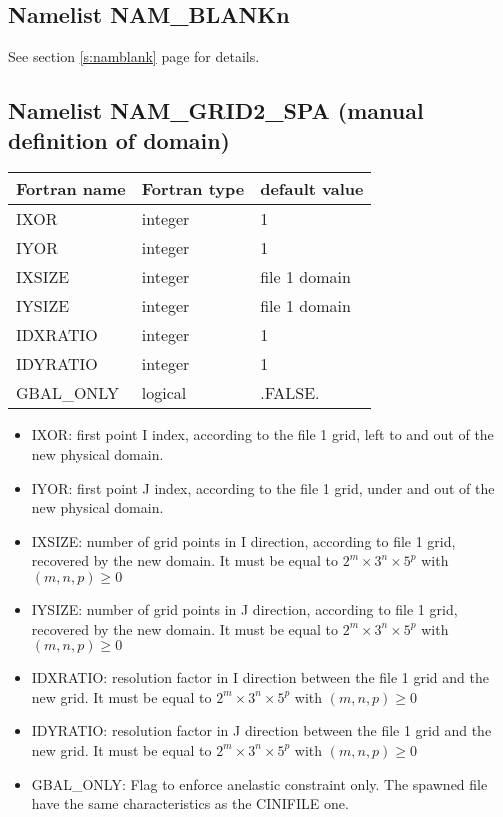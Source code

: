 \subsection{Namelist NAM\_BLANKn} 
See section \ref{s:namblank} page \pageref{s:namblank} for details.
\newpage

\subsection{Namelist NAM\_GRID2\_SPA (manual definition of domain) }

\begin{center}
\begin{tabular} {|l|l|l|}
\hline
Fortran name & Fortran type & default value\\
\hline
\hline
IXOR         & integer    & 1   \\
IYOR         & integer    & 1  \\
IXSIZE       & integer    & file 1 domain  \\
IYSIZE       & integer    & file 1 domain \\
IDXRATIO     & integer    & 1   \\
IDYRATIO     & integer    & 1  \\
GBAL\_ONLY    & logical    & .FALSE.  \\
\hline
\end{tabular}
\end{center}


\begin{itemize}
\item IXOR: first point I index, according to the file 1 grid, left to 
and out of the new physical domain.
\item IYOR: first point J index, according to the file 1 grid, under 
and out of the new physical domain.
\item IXSIZE: number of grid points in I direction, according to file 1 grid, recovered
by the new domain. It must be equal to $2^m \times 3^n \times 5^p$ with $(m,n,p) \ge 0$
\item IYSIZE: number of grid points in J direction, according to file 1 grid, recovered
by the new domain. It must be equal to $2^m \times 3^n \times 5^p$ with $(m,n,p) \ge 0$
\item IDXRATIO: resolution factor in I direction between the file 1 grid and the new grid.
It must be  equal to $2^m \times 3^n \times 5^p$ with $(m,n,p) \ge 0$
\item IDYRATIO: resolution factor in J direction between the file 1 grid and the new grid.
It must be equal to $2^m \times 3^n \times 5^p$ with $(m,n,p) \ge 0$
\item GBAL\_ONLY: Flag  to enforce anelastic constraint only. The spawned file have the same characteristics as the CINIFILE one.
\end{itemize}

